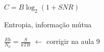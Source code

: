 \documentclass[a4paper,10pt]{article}
\title{}
\author{}
\begin{document}
\maketitle

\begin{abstract}

\end{abstract}

$C = B \log_{2}(1+SNR)$

Entropia, informa\c c\~ao m\'utua

$\frac{Eb}{N_0} = \frac{S}{k T R}$ $\leftarrow$ corrigir na aula 9
\end{document}
